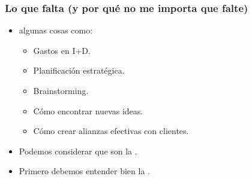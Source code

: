 \frame
{
\frametitle{Lo que falta (y por qué no me importa que falte)}
\begin{itemize}
	\item {} algunas cosas como:
	\begin{itemize}
		\item Gastos en I+D.
		\item Planificación estratégica.
		\item Brainstorming.
		\item Cómo encontrar nuevas ideas.
		\item Cómo crear alianzas efectivas con clientes.
	\end{itemize}
	\item Podemos considerar que son la .
	\item Primero debemos entender bien la .
\end{itemize}
}
